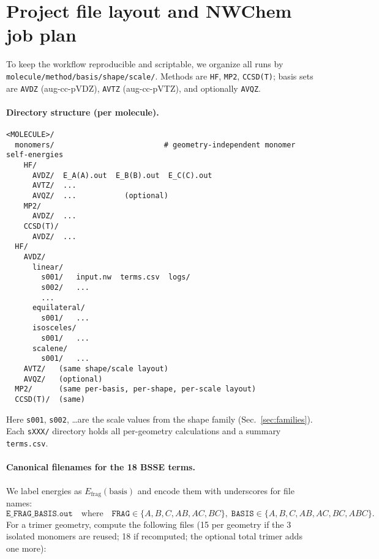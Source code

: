 \section{Project file layout and NWChem job plan}
\label{sec:files}

To keep the workflow reproducible and scriptable, we organize all runs by
\texttt{molecule/method/basis/shape/scale/}.
Methods are \texttt{HF}, \texttt{MP2}, \texttt{CCSD(T)};
basis sets are \texttt{AVDZ} (aug-cc-pVDZ), \texttt{AVTZ} (aug-cc-pVTZ),
and optionally \texttt{AVQZ}.

\paragraph{Directory structure (per molecule).}
\begin{verbatim}
<MOLECULE>/
  monomers/                         # geometry-independent monomer self-energies
    HF/
      AVDZ/  E_A(A).out  E_B(B).out  E_C(C).out
      AVTZ/  ...
      AVQZ/  ...           (optional)
    MP2/
      AVDZ/  ...
    CCSD(T)/
      AVDZ/  ...
  HF/
    AVDZ/
      linear/
        s001/   input.nw  terms.csv  logs/
        s002/   ...
        ...
      equilateral/
        s001/   ...
      isosceles/
        s001/   ...
      scalene/
        s001/   ...
    AVTZ/   (same shape/scale layout)
    AVQZ/   (optional)
  MP2/      (same per-basis, per-shape, per-scale layout)
  CCSD(T)/  (same)
\end{verbatim}

Here \texttt{s001}, \texttt{s002}, \dots are the scale values from the
shape family (Sec.~\ref{sec:families}). Each \texttt{sXXX/} directory holds
all per-geometry calculations and a summary \texttt{terms.csv}.

\paragraph{Canonical filenames for the 18 BSSE terms.}
We label energies as \(E_{\text{frag}}(\text{basis})\) and encode them with
underscores for file names:
\[
\texttt{E\_FRAG\_BASIS.out} \quad \text{where} \quad
\texttt{FRAG}\in\{A,B,C,AB,AC,BC\},\;
\texttt{BASIS}\in\{A,B,C,AB,AC,BC,ABC\}.
\]
For a trimer geometry, compute the following files (15 per geometry if the
3 isolated monomers are reused; 18 if recomputed; the optional total trimer
adds one more):

